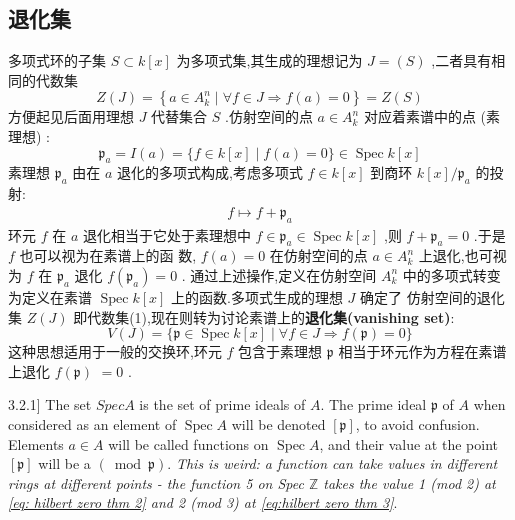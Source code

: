 \subsection{退化集}
多项式环的子集 $S \subset k[x]$ 为多项式集,其生成的理想记为 $J=(S)$ ,二者具有相同的代数集
\begin{equation}\label{eq: hilbert zero thm 1}
Z(J)=\left\{a \in A_k^n \mid \forall f \in J \Rightarrow f(a)=0\right\}=Z(S)
\end{equation}
方便起见后面用理想 $J$ 代替集合 $S$ .仿射空间的点 $a \in A_k^n$ 对应着素谱中的点 (素理想) :
\begin{equation}\label{eq: hilbert zero thm 2}
\mathfrak{p}_a=I(a)=\{f \in k[x] \mid f(a)=0\} \in \operatorname{Spec} k[x]
\end{equation}
素理想 $\mathfrak{p}_a$ 由在 $a$ 退化的多项式构成,考虑多项式 $f \in k[x]$ 到商环 $k[x] / \mathfrak{p}_a$ 的投射:
\begin{align*}
f \mapsto f+\mathfrak{p}_a
\end{align*}
环元 $f$ 在 $a$ 退化相当于它处于素理想中 $f \in \mathfrak{p}_a \in \operatorname{Spec} k[x]$ ,则 $f+\mathfrak{p}_a=0$ .于是 $f$ 也可以视为在素谱上的函 数, $f(a)=0$ 在仿射空间的点 $a \in A_k^n$ 上退化,也可视为 $f$ 在 $\mathfrak{p}_a$ 退化 $f\left(\mathfrak{p}_a\right)=0$ .
通过上述操作,定义在仿射空间 $A_k^n$ 中的多项式转变为定义在素谱 $\operatorname{Spec} k[x]$ 上的函数.多项式生成的理想 $J$ 确定了 仿射空间的退化集 $Z(J)$ 即代数集(1),现在则转为讨论素谱上的\textbf{退化集(vanishing set)}:
\begin{equation}\label{eq:hilbert zero thm 3}
V(J)=\{\mathfrak{p} \in \operatorname{Spec} k[x] \mid \forall f \in J \Rightarrow f(\mathfrak{p})=0\}
\end{equation}
这种思想适用于一般的交换环,环元 $f$ 包含于素理想 $\mathfrak{p}$ 相当于环元作为方程在素谱上退化 $f(\mathfrak{p})$ $=0$ . 

\begin{example}[][from [Vakil2017] 3.2.1]
  The set $S p e c A$ is the set of prime ideals of $A$. The prime ideal $\mathfrak{p}$ of $A$ when considered as an element of $\operatorname{Spec} A$ will be denoted $[\mathfrak{p}]$, to avoid confusion. Elements $a \in A$ will be called functions on $\operatorname{Spec} A$, and their value at the point $[\mathfrak{p}]$ will be a $(\bmod \mathfrak{p})$. \textit{This is weird: a function can take values in different rings at different points - the function 5 on Spec $\mathbb{Z}$ takes the value 1 (mod 2) at \eqref{eq: hilbert zero thm 2} and 2 (mod 3) at \eqref{eq:hilbert zero thm 3}}.
\end{example}

